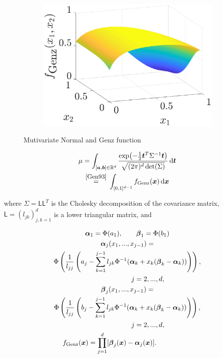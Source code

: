 \documentclass[twocolumn]{svjour3}          %
\newcommand{\bm}[1]{\boldsymbol{#1}}
\newcommand{\mSigma}{\Sigma}
\newcommand{\dif}[1]{\text{d}{#1}}
\newcommand{\reals}{\mathbb{R}}
\newcommand{\valpha}{{\bm{\alpha}}}
\newcommand{\vbeta}{{\bm{\beta}}}
\newcommand{\va}{\bm{a}}
\newcommand{\vb}{\bm{b}}
\newcommand{\vt}{\bm{t}}
\newcommand{\vx}{\bm{x}}
\newcommand{\dvx}{\dif{\bm{x}}}
\newcommand{\dvt}{\dif{\bm{t}}}
\newcommand{\mL}{\mathsf{L}}
\begin{document}
\begin{enumerate}
\begin{figure}
\begin{subfigure}{0.48\textwidth}
\includegraphics[width=\textwidth]{GenzFun}
\end{subfigure}
\caption{Mutivariate Normal and Genz function }
\label{fig:MVN and Genz}
\end{figure}

\begin{multline*}
\mu = \int_{[\va,\vb] \in \reals^d} \frac{\exp\bigl(- \frac 12 \vt^T \mSigma^{-1} \vt \bigr)}{\sqrt{(2 \pi)^d \det(\mSigma)}} \, \dvt 
\\
\overset{\text{\small\cite{Gen93}}}{=} \,
\int_{[0,1]^{d-1}} f_{\text{Genz}}(\vx) \, \dvx 
\end{multline*} 

where $\mSigma= \mL \mL^T$ is the Cholesky decomposition of the covariance matrix, $\mL = (l_{jk})_{j,k=1}^d$ is a lower triangular matrix, and

\begin{multline*}
\valpha_1 = \Phi(a_1), \qquad \vbeta_1 = \Phi(b_1)
\\
\valpha_j(x_1,...,x_{j-1}) = 
\\
\Phi
\left(
\frac{1}{l_{jj}} 
\left(
a_j - \sum_{k=1}^{j-1} l_{jk} \Phi^{-1}(\valpha_k + x_k(\vbeta_k-\valpha_k))
\right)
\right), 
\\
\qquad \qquad \qquad j=2,...,d,
\\
\vbeta_j(x_1,...,x_{j-1}) = 
\\
\Phi
\left(
\frac{1}{l_{jj}} 
\left(
b_j - \sum_{k=1}^{j-1} l_{jk} \Phi^{-1}(\valpha_k + x_k(\vbeta_k-\valpha_k))
\right)
\right), 
\\
\qquad \qquad \qquad j=2,...,d,
\\
f_{\text{Genz}}(\vx) = \prod_{j=1}^d [\vbeta_j(\vx) - \valpha_j(\vx)]. \hspace{12ex}
\end{multline*}


\end{enumerate}
\end{document}
